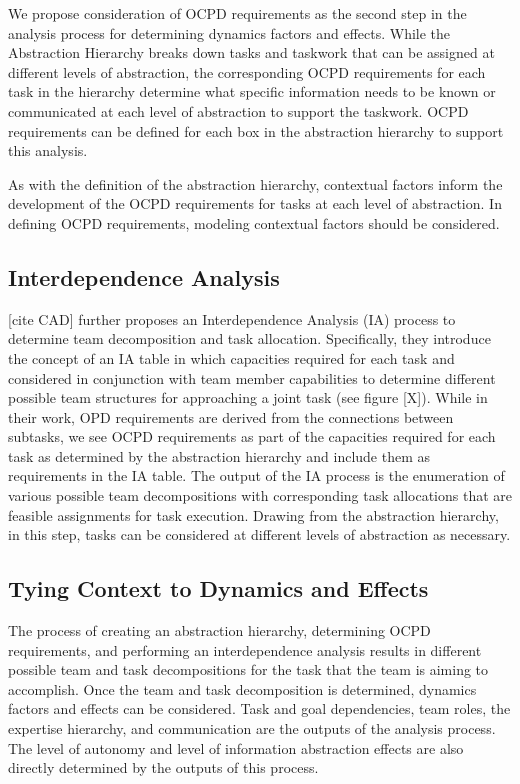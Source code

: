 \documentclass[letterpaper, 10 pt, conference]{ieeeconf}  %
\theoremstyle{definition}
\begin{document}
We propose consideration of OCPD requirements as the second step in the analysis process for determining dynamics factors and effects. While the Abstraction Hierarchy breaks down tasks and taskwork that can be assigned at different levels of abstraction, the corresponding OCPD requirements for each task in the hierarchy determine what specific information needs to be known or communicated at each level of abstraction to support the taskwork. OCPD requirements can be defined for each box in the abstraction hierarchy to support this analysis. %

As with the definition of the abstraction hierarchy, contextual factors inform the development of the OCPD requirements for tasks at each level of abstraction. In defining OCPD requirements, modeling contextual factors should be considered. 

\subsection{Interdependence Analysis}
[cite CAD] further proposes an Interdependence Analysis (IA) process to determine team decomposition and task allocation. Specifically, they introduce the concept of an IA table in which capacities required for each task and considered in conjunction with team member capabilities to determine different possible team structures for approaching a joint task (see figure [X]). While in their work, OPD requirements are derived from the connections between subtasks, we see OCPD requirements as part of the capacities required for each task as determined by the abstraction hierarchy and include them as requirements in the IA table. The output of the IA process is the enumeration of various possible team decompositions with corresponding task allocations that are feasible assignments for task execution. Drawing from the abstraction hierarchy, in this step, tasks can be considered at different levels of abstraction as necessary. 

\subsection{Tying Context to Dynamics and Effects}
The process of creating an abstraction hierarchy, determining OCPD requirements, and performing an interdependence analysis results in different possible team and task decompositions for the task that the team is aiming to accomplish. Once the team and task decomposition is determined, dynamics factors and effects can be considered. Task and goal dependencies, team roles, the expertise hierarchy, and communication are the outputs of the analysis process. The level of autonomy and level of information abstraction effects are also directly determined by the outputs of this process. 
\end{document}
